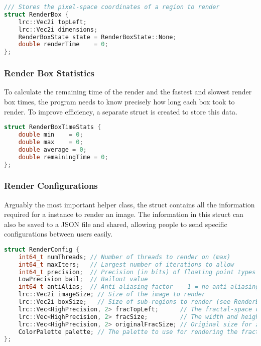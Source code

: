 \begin{lstlisting}[language=c++]
/// Stores the pixel-space coordinates of a region to render
struct RenderBox {
    lrc::Vec2i topLeft;
    lrc::Vec2i dimensions;
    RenderBoxState state = RenderBoxState::None;
    double renderTime	 = 0;
};
\end{lstlisting}

\subsubsection{Render Box Statistics}

To calculate the remaining time of the render and the fastest and slowest render box times, the program needs to know precisely how long each box took to render. To improve efficiency, a separate struct is created to store this data.

\begin{lstlisting}[language=c++]
struct RenderBoxTimeStats {
	double min	  = 0;
	double max	  = 0;
	double average = 0;
	double remainingTime = 0;
};
\end{lstlisting}

\subsubsection{Render Configurations}

Arguably the most important helper class, the  struct contains all the information required for a  instance to render an image. The information in this struct can also be saved to a JSON file and shared, allowing people to send specific configurations between users easily.

\begin{lstlisting}[language=c++]
struct RenderConfig {
	int64_t numThreads; // Number of threads to render on (max)
	int64_t maxIters;	// Largest number of iterations to allow
	int64_t precision;	// Precision (in bits) of floating point types used for arithmetic
	LowPrecision bail;	// Bailout value
	int64_t antiAlias;	// Anti-aliasing factor -- 1 = no anti-aliasing
	lrc::Vec2i imageSize; // Size of the image to render
	lrc::Vec2i boxSize;	  // Size of sub-regions to render (see RenderBox)
	lrc::Vec<HighPrecision, 2> fracTopLeft;		 // The fractal-space center of the image
	lrc::Vec<HighPrecision, 2> fracSize;		 // The width and height of the fractal space
	lrc::Vec<HighPrecision, 2> originalFracSize; // Original size for zoom factor calculation
	ColorPalette palette; // The palette to use for rendering the fractal
};
\end{lstlisting}


